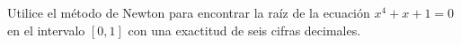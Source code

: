 \item Utilice el método de Newton para encontrar la raíz de la ecuación $x^4 + x + 1 = 0$ en el intervalo $[0, 1]$ con una exactitud de seis cifras decimales.
